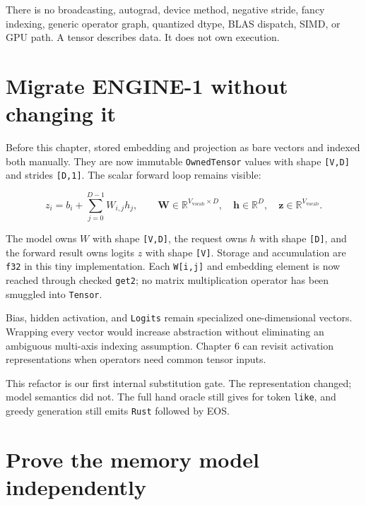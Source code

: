 There is no broadcasting, autograd, device method, negative stride,
fancy indexing, generic operator graph, quantized dtype, BLAS dispatch,
SIMD, or GPU path. A tensor describes data. It does not own execution.

\section{Migrate ENGINE-1 without changing
it}\label{migrate-engine-1-without-changing-it}

Before this chapter, \texttt{} stored
embedding and projection as bare vectors and indexed both manually. They
are now immutable \texttt{OwnedTensor} values with shape
\texttt{{[}V,D{]}} and strides \texttt{{[}D,1{]}}. The scalar forward
loop remains visible:

\begin{equation}
z_i=b_i+\sum_{j=0}^{D-1}W_{i,j}h_j,
\qquad
\mathbf{W}\in\mathbb{R}^{V_{\mathrm{vocab}}\times D},
\quad \mathbf{h}\in\mathbb{R}^{D},
\quad \mathbf{z}\in\mathbb{R}^{V_{\mathrm{vocab}}}.
\end{equation}

The model owns \(W\) with shape \texttt{{[}V,D{]}}, the request owns
\(h\) with shape \texttt{{[}D{]}}, and the forward result owns logits
\(z\) with shape \texttt{{[}V{]}}. Storage and accumulation are
\texttt{f32} in this tiny implementation. Each \texttt{W{[}i,j{]}} and
embedding element is now reached through checked \texttt{get2}; no
matrix multiplication operator has been smuggled into \texttt{Tensor}.

Bias, hidden activation, and \texttt{Logits} remain specialized
one-dimensional vectors. Wrapping every vector would increase
abstraction without eliminating an ambiguous multi-axis indexing
assumption. Chapter 6 can revisit activation representations when
operators need common tensor inputs.

This refactor is our first internal substitution gate. The
representation changed; model semantics did not. The full hand oracle
still gives \texttt{\seqsplit{[-0.7,0.1,0.4,2.2]}} for token
\texttt{like}, and greedy generation still emits \texttt{Rust} followed
by EOS.

\section{Prove the memory model
independently}\label{prove-the-memory-model-independently}

